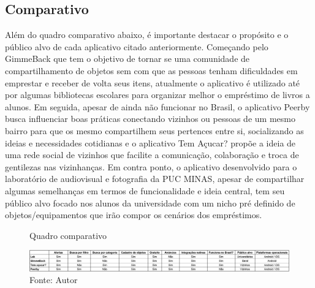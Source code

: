     \subsection{Comparativo}
    
    Além do quadro comparativo abaixo, é importante destacar o propósito e o público alvo de cada aplicativo citado anteriormente. Começando pelo GimmeBack que tem o objetivo de tornar se uma comunidade de compartilhamento de objetos sem com que as pessoas tenham dificuldades em emprestar e receber de volta seus itens, atualmente o aplicativo é utilizado até por algumas bibliotecas escolares para organizar melhor o empréstimo de livros a alunos. Em seguida, apesar de ainda não funcionar no Brasil, o aplicativo Peerby busca influenciar boas práticas conectando vizinhos ou pessoas de um mesmo bairro para que os mesmo compartilhem seus pertences entre si, socializando as ideias e necessidades cotidianas e o aplicativo Tem Açucar? propõe a ideia de uma rede social de vizinhos que facilite a comunicação, colaboração e troca de gentilezas nas vizinhanças. Em contra ponto, o aplicativo desenvolvido para o laboratório de audiovisual e fotografia da PUC MINAS, apesar de compartilhar algumas semelhanças em termos de funcionalidade e ideia central, tem seu público alvo focado nos alunos da universidade com um nicho pré definido de objetos/equipamentos que irão compor os cenários dos empréstimos.
    
    \begin{figure}[h]
    \caption{Quadro comparativo}
    \centering %
    \includegraphics[width=16cm]{imagem/quadro-comparativo.png}
    \caption*{Fonte: Autor}
    \label{figura:comparative-board}
    \end{figure}
